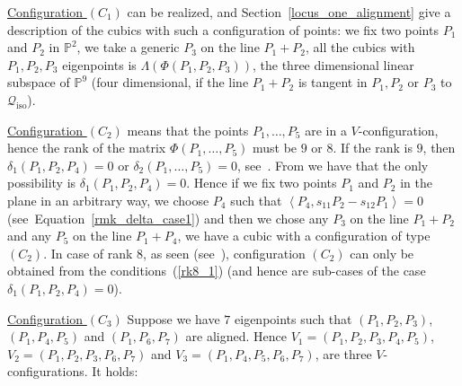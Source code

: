 \documentclass{amsart}
\theoremstyle{plain}
\theoremstyle{definition}
\newcommand{\iso}{\mathcal{Q}_{\mathrm{iso}}}
\newcommand{\scl}[2]{\left\langle {#1}, {#2} \right\rangle}
\begin{document}
\underline{Configuration $(C_1)$} can be realized,
 and Section~\ref{locus_one_alignment}
give a description of the cubics with such a configuration of points:
we fix two points $P_1$ and $P_2$ in $\mathbb{P}^2$, we take a generic $P_3$
on the line $P_1+P_2$, all the cubics with
$P_1, P_2, P_3$ eigenpoints is $\Lambda(\Phi(P_1, P_2, P_3))$, the three
dimensional linear subspace of $\mathbb{P}^9$ (four dimensional, if the
line $P_1+P_2$ is tangent in $P_1, P_2$ or $P_3$ to $\iso$).

\underline{Configuration $(C_2)$} means that the points
$P_1, \dots, P_5$ are in a
$V$-configuration, hence the rank of the matrix $\Phi(P_1, \dots, P_5)$
must be $9$ or $8$. If the rank is $9$, then $\delta_1(P_1, P_2, P_4) = 0$
or $\delta_2(P_1, \dots, P_5) = 0$, see~.
From  we have that the only possibility
is $\delta_1(P_1, P_2, P_4) = 0$. Hence if we fix two points $P_1$ and $P_2$
in the plane in an arbitrary way, we choose $P_4$ such that
$\scl{P_4}{s_{11}P_2-s_{12}P_1}=0$
(see~Equation~\eqref{rmk_delta_case1}) and then we chose any $P_3$
on the line $P_1+P_2$ and any $P_5$ on the line $P_1+P_4$, we have a cubic
with a configuration of type $(C_2)$. In case of rank $8$, as seen
(see~),
configuration $(C_2)$ can only be
obtained from the conditions~(\ref{rk8_1}) (and hence are sub-cases
of the case $\delta_1(P_1, P_2, P_4)=0$).

\underline{Configuration $(C_3)$} Suppose we have $7$ eigenpoints such that
$(P_1, P_2, P_3)$, $(P_1, P_4, P_5)$ and $(P_1, P_6, P_7)$ are
aligned. Hence
$V_1 = (P_1, P_2, P_3, P_4, P_5)$, $V_2 = (P_1, P_2, P_3, P_6, P_7)$ and
$V_3 = (P_1, P_4, P_5, P_6, P_7)$, are three $V$-configurations. It holds:
\end{document}
